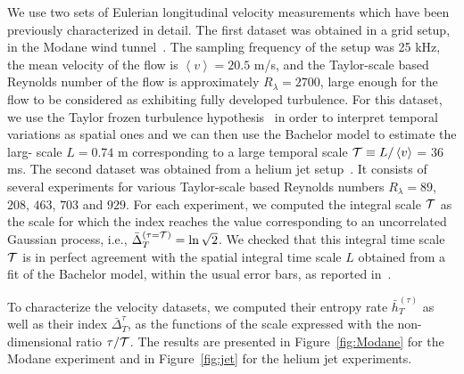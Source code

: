 \documentclass[aps,pra,groupedaddress,notitlepage]{revtex4-1}
\begin{document}
We use two sets of Eulerian longitudinal velocity measurements which have been previously characterized in detail.
%
The first dataset was obtained in a grid setup, in the Modane wind tunnel~\cite{Kahalerras1998}. The sampling frequency of the setup was 25 kHz, the mean velocity of the flow is $\left\langle v\right\rangle=20.5$ m/s, and the Taylor-scale based Reynolds number of the flow is approximately $R_\lambda=2700$, large enough for the flow to be considered as exhibiting fully developed turbulence. 
For this dataset, we use the Taylor frozen turbulence hypothesis~\cite{Frisch:1995} in order to interpret temporal variations as spatial ones and we can then use the Bachelor model to estimate the larg- scale $L=0.74$ m corresponding to a large temporal scale ${\cal T}\equiv L/\left\langle v\right\rangle$ = 36 ms.
%
The second dataset was obtained from a helium jet setup~\cite{Chanal2000}. It consists of several experiments for various Taylor-scale based Reynolds numbers $R_\lambda=89$, $208$, $463$, $703$ and $929$. 
%
For each experiment, we computed the integral scale $\cal{T}$ as the scale for which the index reaches the value corresponding to an uncorrelated Gaussian process, {i.e.}, $\bar{\Delta}_T^{(\tau={\cal T})}=\ln\sqrt{2}$.
We checked that this integral time scale ${\cal T}$ is in perfect agreement with the spatial integral time scale $L$ obtained from a fit of the Bachelor model, within the usual error bars, as reported in~\cite{Chanal2000}.


To characterize the velocity datasets, we computed their entropy rate $\bar{h}_T^{(\tau)}$ as well as their index $\bar{\Delta}_T^{\tau}$, as the functions of the scale expressed with the non-dimensional ratio $\tau/{\cal T}$. The results are presented in Figure~\ref{fig:Modane} for the Modane experiment and in Figure~\ref{fig:jet} for the helium jet experiments.
\end{document}
